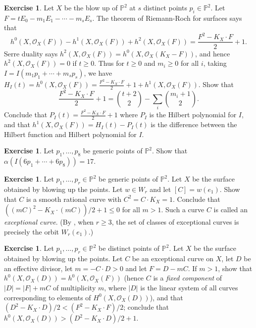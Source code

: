 \documentclass[11pt,twoside]{amsart}
\numberwithin{equation}{section}
\newcounter{xrcs}[section]
\theoremstyle{definition}
\newtheorem{exercise}[xrcs]{Exercise}
\begin{document}
\begin{exercise}\label{RRexercise}
Let $X$ be the blow up of ${\mathbb{P}^{2}}$ at $s$ distinct points $p_i\in{\mathbb{P}^{2}}$.
Let $F=tE_0-m_1E_1-\cdots-m_sE_s$. The theorem of 
Riemann-Roch for surfaces says that 
$$h^0(X,{{\mathcal O}}_X(F))-h^1(X,{{\mathcal O}}_X(F))+h^2(X,{{\mathcal O}}_X(F))=\frac{F^2-K_X\cdot F}{2}+1.$$
Serre duality says $h^2(X,{{\mathcal O}}_X(F))=h^0(X,{{\mathcal O}}_X(K_X-F))$,
and hence $h^2(X,{{\mathcal O}}_X(F))=0$ if $t\geq0$.
Thus for $t\geq 0$ and $m_i\geq 0$ for all $i$, taking $I=I(m_1p_1+\cdots+m_sp_s)$, we have
$H_I(t)=h^0(X,{{\mathcal O}}_X(F))=\frac{F^2-K_X\cdot F}{2}+1+h^1(X,{{\mathcal O}}_X(F))$.
Show that
$$\frac{F^2-K_X\cdot F}{2}+1=\binom{t+2}{2}-\sum_i\binom{m_i+1}{2}.$$
Conclude that $P_I(t)=\frac{F^2-K_X\cdot F}{2}+1$ where $P_I$ is the Hilbert polynomial for $I$, 
and that $h^1(X,{{\mathcal O}}_X(F))=H_I(t)-P_I(t)$ is the difference between
the Hilbert function and Hilbert polynomial for $I$. 
\end{exercise}

\begin{exercise}\label{homaloidalclass}
Let $p_1,\ldots,p_8$ be generic points of ${\mathbb{P}^{2}}$.
Show that $\alpha(I(6p_1+\cdots+6p_8))=17$.
\end{exercise}

\begin{exercise}\label{exceptionalclass}
Let $p_1,\ldots,p_r\in{\mathbb{P}^{2}}$ be generic points of ${\mathbb{P}^{2}}$.
Let $X$ be the surface obtained by blowing up the points.
Let $w\in W_r$ and let $[C]=w(e_1)$.
Show that $C$ is a smooth rational curve with $C^2=C\cdot K_X=1$.
Conclude that $((mC)^2-K_X\cdot (mC))/2+1\leq0$ for all $m>1$.
Such a curve $C$ is called an \emph{exceptional curve}.
(By \cite[Theorem 2b]{refN2}, when $r\geq3$, the set of classes of exceptional curves 
is precisely the orbit $W_r(e_1)$.)
\end{exercise}

\begin{exercise}\label{fcexercise}
Let $p_1,\ldots,p_r\in{\mathbb{P}^{2}}$ be distinct points of ${\mathbb{P}^{2}}$.
Let $X$ be the surface obtained by blowing up the points.
Let $C$ be an exceptional curve on $X$, let $D$ be an effective
divisor, let $m=-C\cdot D>0$ and let $F=D-mC$. If $m>1$,
show that $h^0(X,{{\mathcal O}}_X(D))=h^0(X,{{\mathcal O}}_X(F))$ (hence
$C$ is a \emph{fixed component} of $|D|=|F|+mC$ of multiplicity $m$, 
where $|D|$ is the linear system of all curves
corresponding to elements of $H^0(X,{{\mathcal O}}_X(D))$),
and that $(D^2-K_X\cdot D)/2<(F^2-K_X\cdot F)/2$;
conclude that $h^0(X,{{\mathcal O}}_X(D))>(D^2-K_X\cdot D)/2+1$.
\end{exercise}
\end{document}
